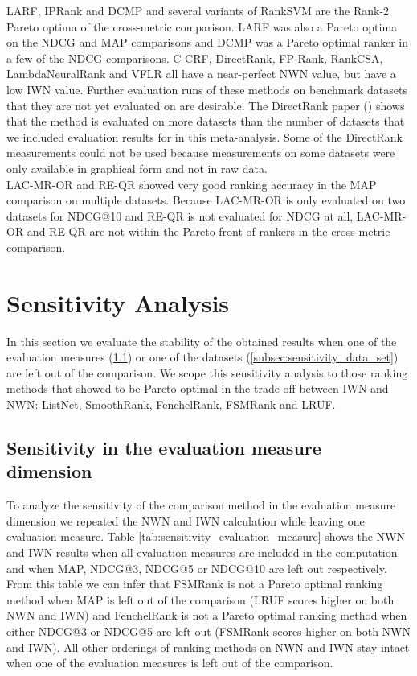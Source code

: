 \documentclass[english, authoryear, preprint]{elsarticle}
\begin{document}
LARF, IPRank and DCMP and several variants of RankSVM are the Rank-2 Pareto optima of the cross-metric comparison. LARF was also a Pareto optima on the NDCG and MAP comparisons and DCMP was a Pareto optimal ranker in a few of the NDCG comparisons. C-CRF, DirectRank, FP-Rank, RankCSA, LambdaNeuralRank and VFLR all have a near-perfect NWN value, but have a low IWN value. Further evaluation runs of these methods on benchmark datasets that they are not yet evaluated on are desirable. The DirectRank paper (\cite{Tan2013}) shows that the method  is evaluated on more datasets than the number of datasets that we included evaluation results for in this meta-analysis. Some of the DirectRank measurements could not be used because measurements on some datasets were only available in graphical form and not in raw data.\\

LAC-MR-OR and RE-QR showed very good ranking accuracy in the MAP comparison on multiple datasets. Because LAC-MR-OR is only evaluated on two datasets for NDCG@10 and RE-QR is not evaluated for NDCG at all, LAC-MR-OR and RE-QR are not within the Pareto front of rankers in the cross-metric comparison. 

\section{Sensitivity Analysis}
In this section we evaluate the stability of the obtained results when one of the evaluation measures (\ref{subsec:sensitivity_evaluation_measure}) or one of the datasets (\ref{subsec:sensitivity_data_set}) are left out of the comparison. We scope this sensitivity analysis to those ranking methods that showed to be Pareto optimal in the trade-off between IWN and NWN: ListNet, SmoothRank, FenchelRank, FSMRank and LRUF.
\subsection{Sensitivity in the evaluation measure dimension}
\label{subsec:sensitivity_evaluation_measure}
To analyze the sensitivity of the comparison method in the evaluation measure dimension we repeated the NWN and IWN calculation while leaving one evaluation measure. Table \ref{tab:sensitivity_evaluation_measure} shows the NWN and IWN results when all evaluation measures are included in the computation and when MAP, NDCG@3, NDCG@5 or NDCG@10 are left out respectively. From this table we can infer that FSMRank is not a Pareto optimal ranking method when MAP is left out of the comparison (LRUF scores higher on both NWN and IWN) and FenchelRank is not a Pareto optimal ranking method when either NDCG@3 or NDCG@5 are left out (FSMRank scores higher on both NWN and IWN). All other orderings of ranking methods on NWN and IWN stay intact when one of the evaluation measures is left out of the comparison.\\
\end{document}

